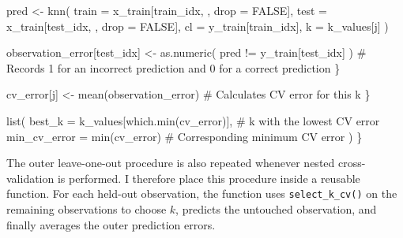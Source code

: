 \documentclass[
  letterpaper,
  DIV=11,
  numbers=noendperiod]{scrreprt}
\newenvironment{Shaded}{\begin{snugshade}}{\end{snugshade}}
\newcommand{\AttributeTok}[1]{\textcolor[rgb]{0.40,0.45,0.13}{#1}}
\newcommand{\CommentTok}[1]{\textcolor[rgb]{0.37,0.37,0.37}{#1}}
\newcommand{\ConstantTok}[1]{\textcolor[rgb]{0.56,0.35,0.01}{#1}}
\newcommand{\FunctionTok}[1]{\textcolor[rgb]{0.28,0.35,0.67}{#1}}
\newcommand{\NormalTok}[1]{\textcolor[rgb]{0.00,0.23,0.31}{#1}}
\newcommand{\OtherTok}[1]{\textcolor[rgb]{0.00,0.23,0.31}{#1}}
\newcommand{\SpecialCharTok}[1]{\textcolor[rgb]{0.37,0.37,0.37}{#1}}
\begin{document}
\begin{Shaded}
\begin{Highlighting}[]
\NormalTok{      pred }\OtherTok{\textless{}{-}} \FunctionTok{knn}\NormalTok{(}
        \AttributeTok{train =}\NormalTok{ x\_train[train\_idx, , }\AttributeTok{drop =} \ConstantTok{FALSE}\NormalTok{],}
        \AttributeTok{test =}\NormalTok{ x\_train[test\_idx, , }\AttributeTok{drop =} \ConstantTok{FALSE}\NormalTok{],}
        \AttributeTok{cl =}\NormalTok{ y\_train[train\_idx],}
        \AttributeTok{k =}\NormalTok{ k\_values[j]}
\NormalTok{      )}
      
\NormalTok{      observation\_error[test\_idx] }\OtherTok{\textless{}{-}} \FunctionTok{as.numeric}\NormalTok{(}
\NormalTok{        pred }\SpecialCharTok{!=}\NormalTok{ y\_train[test\_idx]}
\NormalTok{      ) }\CommentTok{\# Records 1 for an incorrect prediction and 0 for a correct prediction}
\NormalTok{    \}}
    
\NormalTok{    cv\_error[j] }\OtherTok{\textless{}{-}} \FunctionTok{mean}\NormalTok{(observation\_error) }\CommentTok{\# Calculates CV error for this k}
\NormalTok{  \}}
  
  \FunctionTok{list}\NormalTok{(}
    \AttributeTok{best\_k =}\NormalTok{ k\_values[}\FunctionTok{which.min}\NormalTok{(cv\_error)], }\CommentTok{\# k with the lowest CV error}
    \AttributeTok{min\_cv\_error =} \FunctionTok{min}\NormalTok{(cv\_error) }\CommentTok{\# Corresponding minimum CV error}
\NormalTok{  )}
\NormalTok{\}}
\end{Highlighting}
\end{Shaded}

The outer leave-one-out procedure is also repeated whenever nested
cross-validation is performed. I therefore place this procedure inside a
reusable function. For each held-out observation, the function uses
\texttt{select\_k\_cv()} on the remaining observations to choose \(k\),
predicts the untouched observation, and finally averages the outer
prediction errors.
\end{document}
